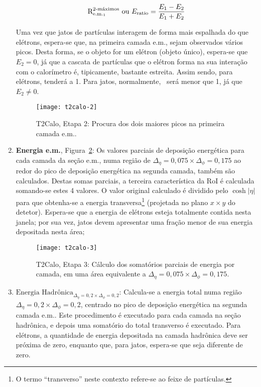 \begin{enumerate}
\begin{equation}
\eratio \text{ ou } E_\text{ratio} = \frac{E_1-E_2}{E_1+E_2}
\end{equation}

Uma vez que jatos de par\-tí\-culas interagem de forma mais espalhada do que
e\-lé\-trons, espera-se que, na primeira camada e.m., sejam observados vários
picos. Desta forma, se o objeto for um elétron (objeto único), espera-se que
$E_2=0$, já que a cascata de partículas que o elétron forma na sua interação
com o calorímetro é, tipicamente, bastante estreita. Assim sendo, para
elétrons, \eratio tenderá a 1. Para jatos, normalmente, \eratio\ será menor
que 1, já que $E_2 \neq 0$.

\begin{figure}
\begin{center}
\texttt{[image: t2calo-2]}
\end{center}
\caption{T2Calo, Etapa 2: Procura dos dois maiores picos na primeira camada e.m..}
\label{fig:t2calo-2}
\end{figure}

\item \textbf{Energia e.m.}, Figura~\ref{fig:t2calo-3}: Os valores parciais de
deposição energética para cada camada da seção e.m., numa região de
$\Delta_\eta=0,075\times\Delta_\phi=0,175$ ao redor do pico de deposição
energética na segunda camada, também são calculados. Destas somas parciais, a
terceira característica da RoI é calculada somando-se estes 4 valores. O valor
original calculado é dividido pelo $\cosh{|\eta|}$ para que obtenha-se a
energia transversa\footnote{O termo ``transverso'' neste contexto refere-se ao
feixe de partículas.} (projetada no plano $x \times y$ do detetor). Espera-se
que a energia de elétrons esteja totalmente contida nesta janela; por sua vez,
jatos devem apresentar uma fração menor de sua energia depositada nesta área;

\begin{figure}
\begin{center}
\texttt{[image: t2calo-3]}
\end{center}
\caption{T2Calo, Etapa 3: Cálculo dos somatórios parciais de energia por
camada, em uma área equivalente a $\Delta_\eta=0,075\times\Delta_\phi=0,175$.}
\label{fig:t2calo-3}
\end{figure}

\item \textbf{$\text{Energia
Hadrônica}_{\Delta_\eta=0,2\times\Delta_\phi=0,2}$}: Calcula-se a energia
total numa região $\Delta_\eta=0,2\times\Delta_\phi=0,2$, centrado no pico de
deposição energética na segunda camada e.m.. Este procedimento é executado
para cada camada na seção hadrônica, e depois uma somatório do total
transverso é executado. Para elétrons, a quantidade de energia depositada na
camada hadrônica deve ser próxima de zero, enquanto que, para jatos, espera-se
que seja diferente de zero.


\end{enumerate}
